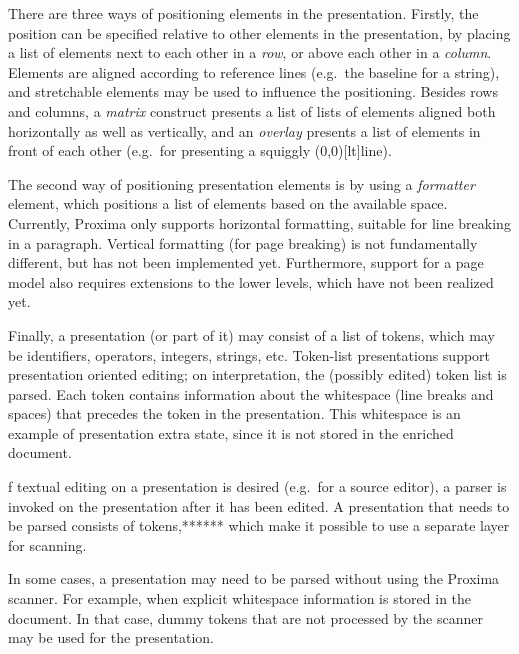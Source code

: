 There are three ways of positioning elements in the presentation. Firstly, the position can be specified relative to other elements in the presentation, by placing a list of elements next to each other in a {\em row}, or above each other in a {\em column}. Elements are aligned according to reference lines (e.g.\ the baseline for a string), and stretchable elements may be used to influence the positioning. Besides rows and columns, a {\em matrix} construct presents a list of lists of elements aligned both horizontally as well as vertically, and an {\em overlay} presents a list of elements in front of each other (e.g.\ for presenting a squiggly \makebox(0,0)[lt]{}line). 

The second way of positioning presentation elements is by using a {\em formatter} element, which positions a list of elements based on the available space. Currently, Proxima only supports horizontal formatting, suitable for line breaking in a paragraph. Vertical formatting (for page breaking) is not fundamentally different, but has not been implemented yet. Furthermore, support for a page model also requires extensions to the lower levels, which have not been realized yet.

Finally, a presentation (or part of it) may consist of a list of tokens, which may be identifiers, operators, integers, strings, etc. Token-list presentations support presentation oriented editing; on interpretation, the (possibly edited) token list is parsed. Each token contains information about the whitespace (line breaks and spaces) that precedes the token in the presentation. This whitespace is an example of presentation extra state, since it is not stored in the enriched document. 

\bc f textual editing on a presentation is desired (e.g.\ for a source editor), a parser is invoked on the presentation after it has been edited. A presentation that needs to be parsed consists of tokens,****** which make it possible to use a separate layer for scanning. \ec

\bc In some cases, a presentation may need to be parsed without using the Proxima scanner. For example, when explicit whitespace information is stored in the document. In that case, dummy tokens that are not processed by the scanner may be used for the presentation. \ec

